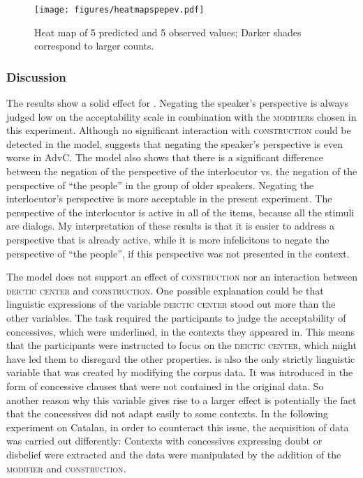 \begin{figure}
	\centering
	\texttt{[image: figures/heatmapspepev.pdf]}
	\caption{Heat map of 5 predicted and 5 observed values; Darker  shades  correspond to
		larger counts.\label{fig:spepevheatmap}}
\end{figure}

\subsubsection{Discussion}
The results show a  solid effect for \textsc{}.  Negating the speaker's perspective is always judged low on the acceptability scale in combination with the \textsc{modifier}s chosen in this experiment. Although no significant interaction with \textsc{construction} could be detected in the model,   suggests that negating the speaker's perspective is even worse in AdvC.  The model also shows that there is a significant difference between the negation of the perspective of the interlocutor vs. the negation of the perspective of ``the people'' in the group of older speakers. Negating the interlocutor's perspective is more acceptable in the present experiment. The perspective of the interlocutor is active in all of the items, because all the stimuli are dialogs. My interpretation of these results is that it is easier to address a perspective that is already active, while it is more infelicitous to negate the perspective of ``the people'', if this perspective was not presented in the context.

 
The model does not support an effect of \textsc{construction} nor an interaction between \textsc{deictic center} and \textsc{construction}. One possible explanation could be that linguistic expressions of the variable \textsc{deictic center} stood  out more than the other variables.  The task required the participants to judge the acceptability of  concessives, which were underlined, in the contexts they appeared in. This means that the participants were instructed to focus on the \textsc{deictic center}, which might have led them to  disregard the other properties.  \textsc{} is also the only strictly linguistic variable that was created by modifying the corpus data. It was  introduced in the form of concessive clauses that were not contained in the original data.  So another reason why this variable gives rise to a larger effect is potentially the fact that the concessives did not adapt easily to some contexts.  In the following experiment on Catalan, in order to counteract this issue, the  acquisition of data was carried out differently: Contexts with concessives expressing doubt or disbelief were extracted and the data were manipulated by the addition of the \textsc{modifier} and \textsc{construction}.
 
